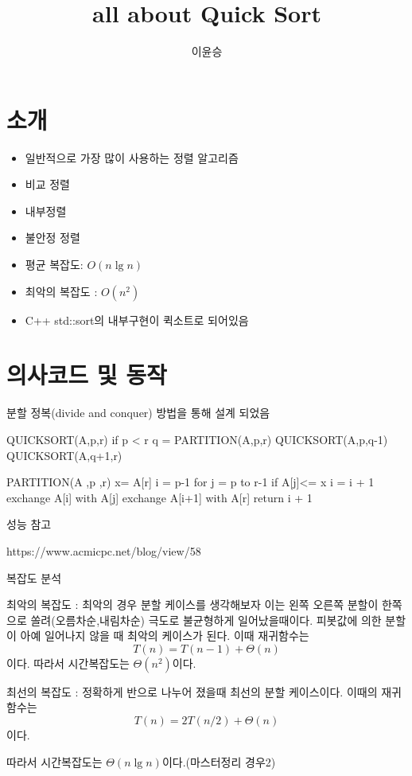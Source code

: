 \documentclass{oblivoir}
\title{all about Quick Sort}
\author{이윤승}
\begin{document}
    

\maketitle

\section{소개}

\begin{itemize}
    \item 일반적으로 가장 많이 사용하는 정렬 알고리즘
    \item 비교 정렬
    \item 내부정렬
    \item 불안정 정렬
    \item 평균 복잡도: $O(n \lg n)$
    \item 최악의 복잡도 : $O(n^2)$
    \item C++ std::sort의 내부구현이 퀵소트로 되어있음
\end{itemize}

\section{의사코드 및 동작}

분할 정복(divide and conquer) 방법을 통해 설계 되었음


QUICKSORT(A,p,r)
    if p < r
        q = PARTITION(A,p,r)
        QUICKSORT(A,p,q-1)
        QUICKSORT(A,q+1,r)


PARTITION(A ,p ,r)
    x= A[r]
    i = p-1
    for j = p to r-1
        if A[j]<= x
            i = i + 1
            exchange A[i] with A[j]
    exchange A[i+1] with A[r]
    return i + 1


성능 참고

https://www.acmicpc.net/blog/view/58


복잡도 분석

최악의 복잡도 : 최악의 경우 분할 케이스를 생각해보자 
이는 왼쪽 오른쪽 분할이 한쪽으로 쏠려(오름차순,내림차순) 극도로 불균형하게 일어났을때이다.
피봇값에 의한 분할이 아예 일어나지 않을 때 최악의 케이스가 된다.
이때 재귀함수는 
$$T(n) = T(n-1) + \Theta(n)$$이다.
따라서 시간복잡도는 $\Theta(n^2)$이다.

최선의 복잡도 : 정확하게 반으로 나누어 졌을때 최선의 분할 케이스이다.
이때의 재귀함수는
$$T(n) = 2T(n/2) + \Theta(n)$$
이다.

따라서 시간복잡도는 $\Theta(n \lg n)$이다.(마스터정리 경우2)
\end{document}
